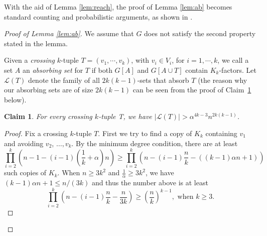 \documentclass[reqno]{amsart}
\theoremstyle{plain}
\newtheorem{claim}[theorem]{Claim}
\def\a{\alpha}
\begin{document}
With the aid of Lemma \ref{lem:reach}, the proof of Lemma \ref{lem:ab} becomes standard counting and probabilistic arguments, as shown in \cite{HPS}.
\begin{proof}
[Proof of Lemma \ref{lem:ab}]
We assume that $G$ does not satisfy the second property stated in the lemma.

Given a \emph{crossing} $k$-tuple $T=(v_1,\cdots,v_k)$, with $v_i\in V_i$, for $i=1,\cdots,k$, we call a set $A$ an \emph{absorbing set} for $T$ if both $G[A]$ and $G[A\cup T]$ contain $K_k$-factors. Let $\mathcal{L}(T)$ denote the family of all $2k(k-1)$-sets that absorb $T$ (the reason why our absorbing sets are of size $2k(k-1)$ can be seen from the proof of Claim~\ref{clm:abT} below).


\begin{claim}\label{clm:abT}
For every crossing $k$-tuple T, we have $|\mathcal{L}(T)|>\alpha^{4k-3}n^{2k(k-1)}$.
\end{claim}

\begin{proof}

Fix a crossing $k$-tuple $T$. First we try to find a copy of $K_k$ containing $v_1$ and avoiding $v_2$, $\dots, v_k$. By the minimum degree condition, there are at least
\[
\prod^k_{i=2}\left(n-1-(i-1)\left(\frac1k+\a \right)n\right) \ge \prod^k_{i=2} \left(n - (i-1)\frac n k - ((k - 1)\a n + 1)\right)
\]
such copies of $K_k$. When $n\ge 3k^2$ and $\frac1{\a} \ge 3k^2$, we have $(k-1)\a n + 1 \le n/(3k)$ and thus the number above is at least
\[
\prod^k_{i=2} \left(n - (i-1)\frac n k - \frac{n}{3k}\right) \ge \left(\frac n k\right)^{k-1}, \text{ when }k\ge 3.
\]



\end{proof}
\end{proof}
\end{document}
